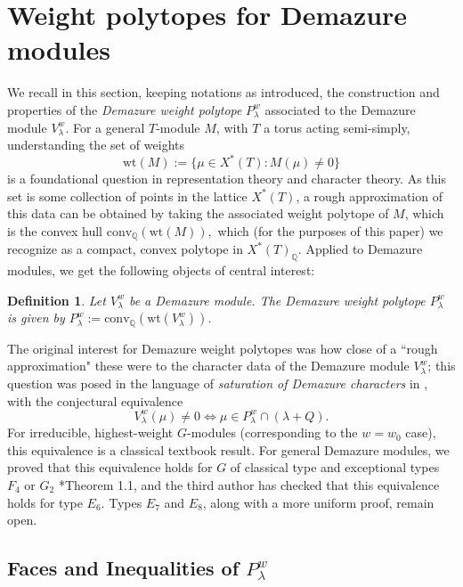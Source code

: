 \documentclass[12pt,reqno]{amsart}
\newtheorem{definition}[theorem]{Definition}
\theoremstyle{definition}
\begin{document}
\section{Weight polytopes for Demazure modules} \label{Polytopes}

We recall in this section, keeping notations as introduced, the construction and properties of the \textit{Demazure weight polytope} $P_\lambda^w$ associated to the Demazure module $V_\lambda^w$. For a general $T$-module $M$, with $T$ a torus acting semi-simply, understanding the set of weights 
$$
\mathrm{wt}(M):=\{\mu \in X^\ast(T): M(\mu) \neq 0 \}
$$
is a foundational question in representation theory and character theory. As this set is some collection of points in the lattice $X^\ast(T)$, a rough approximation of this data can be obtained by taking the associated weight polytope of $M$, which is the convex hull 
$
\mathrm{conv}_{\mathbb{Q}}\left(\mathrm{wt}(M)\right),
$
which (for the purposes of this paper) we recognize as a compact, convex polytope in $X^\ast(T)_\mathbb{Q}$. Applied to Demazure modules, we get the following objects of central interest:

\begin{definition} Let $V_\lambda^w$ be a Demazure module. The Demazure weight polytope $P_\lambda^w$ is given by $P_\lambda^w:=\mathrm{conv}_{\mathbb{Q}}\left(\mathrm{wt}(V_\lambda^w)\right)$.
\end{definition}

The original interest for Demazure weight polytopes was how close of a ``rough approximation" these were to the character data of the Demazure module $V_\lambda^w$; this question was posed in the language of \textit{saturation of Demazure characters} in \cite{BJK2}, with the conjectural equivalence 
$$
V_\lambda^w (\mu) \neq 0 \iff \mu \in P_\lambda^w \cap (\lambda + Q).
$$
For irreducible, highest-weight $G$-modules (corresponding to the $w=w_0$ case), this equivalence is a classical textbook result. For general Demazure modules, we proved that this equivalence holds for $G$ of classical type and exceptional types $F_4$ or $G_2$ \cite{BJK2}*{Theorem 1.1}, and the third author has checked that this equivalence holds for type $E_6$. Types $E_7$ and $E_8$, along with a more uniform proof, remain open. 


\subsection{Faces and Inequalities of $P_\lambda^w$}
\end{document}
